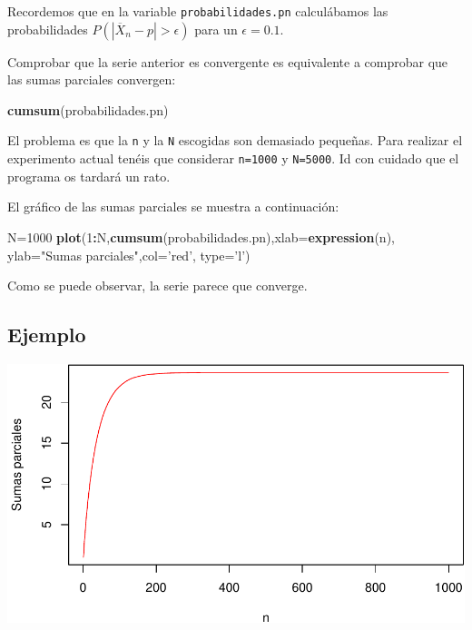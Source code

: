 \documentclass[]{book}
\newenvironment{Shaded}{\begin{snugshade}}{\end{snugshade}}
\newcommand{\DataTypeTok}[1]{\textcolor[rgb]{0.13,0.29,0.53}{#1}}
\newcommand{\DecValTok}[1]{\textcolor[rgb]{0.00,0.00,0.81}{#1}}
\newcommand{\KeywordTok}[1]{\textcolor[rgb]{0.13,0.29,0.53}{\textbf{#1}}}
\newcommand{\NormalTok}[1]{#1}
\newcommand{\OperatorTok}[1]{\textcolor[rgb]{0.81,0.36,0.00}{\textbf{#1}}}
\newcommand{\StringTok}[1]{\textcolor[rgb]{0.31,0.60,0.02}{#1}}
\begin{document}
Recordemos que en la variable \texttt{probabilidades.pn} calculábamos las probabilidades \(P(|\overline{X}_n-p|>\epsilon)\) para un \(\epsilon =0.1\).

Comprobar que la serie anterior es convergente es equivalente a comprobar que las sumas parciales convergen:

\begin{Shaded}
\begin{Highlighting}[]
\KeywordTok{cumsum}\NormalTok{(probabilidades.pn)}
\end{Highlighting}
\end{Shaded}

El problema es que la \texttt{n} y la \texttt{N} escogidas son demasiado pequeñas. Para realizar el experimento actual tenéis que considerar \texttt{n=1000} y \texttt{N=5000}. Id con cuidado que el programa os tardará un rato.

El gráfico de las sumas parciales se muestra a continuación:

\begin{Shaded}
\begin{Highlighting}[]
\NormalTok{N=}\DecValTok{1000}
\KeywordTok{plot}\NormalTok{(}\DecValTok{1}\OperatorTok{:}\NormalTok{N,}\KeywordTok{cumsum}\NormalTok{(probabilidades.pn),}\DataTypeTok{xlab=}\KeywordTok{expression}\NormalTok{(n),}
     \DataTypeTok{ylab=}\StringTok{"Sumas parciales"}\NormalTok{,}\DataTypeTok{col=}\StringTok{'red'}\NormalTok{, }\DataTypeTok{type=}\StringTok{'l'}\NormalTok{)}
\end{Highlighting}
\end{Shaded}

Como se puede observar, la serie parece que converge.

\hypertarget{ejemplo-151}{%
\subsection{Ejemplo}\label{ejemplo-151}}

\includegraphics{curso-probabilidad-udemy_files/figure-latex/unnamed-chunk-182-1.pdf}
\end{document}
